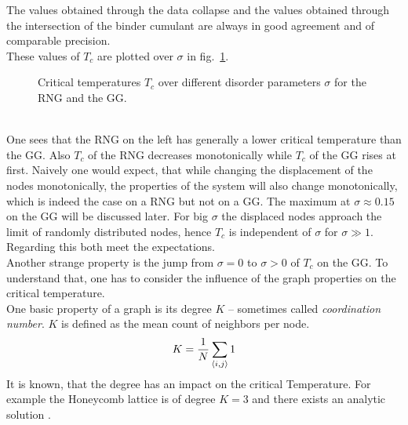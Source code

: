     The values obtained through the data collapse and the values obtained
    through the intersection of the binder cumulant are always in good
    agreement and of comparable precision.\\
    These values of \(T_c\) are plotted over \(\sigma\) in fig.\ \ref{fig:Tc}.
    \begin{figure}[htbp]
        \centering
        \caption[Critical Temperature over Different Disorder Parameters]
        {
            Critical temperatures \(T_c\) over different
            disorder parameters \(\sigma\) for
             the RNG and
             the GG.\\
        }
        \label{fig:Tc}
    \end{figure}\\
    One sees that the RNG on the left has generally a lower critical
    temperature than the GG. Also \(T_c\) of the RNG decreases
    monotonically while \(T_c\) of the GG rises at first. Naively one would
    expect, that while changing the displacement of the nodes monotonically,
    the properties of the system will also change monotonically, which is
    indeed the case on a RNG but not on a GG. The
    maximum at \(\sigma \approx 0.15\) on the GG will be discussed later.
    For big \(\sigma\) the displaced nodes approach the limit of randomly
    distributed nodes, hence \(T_c\) is independent of \(\sigma\) for
    \(\sigma \gg 1\). Regarding this both meet the expectations.\\
    Another strange property is the jump from \(\sigma = 0\) to \(\sigma > 0\)
    of \(T_c\) on the GG. To understand that, one has to
    consider the influence of the graph properties on the critical
    temperature.\\
    One basic property of a graph is its degree \(K\) -- sometimes
    called \emph{coordination number}. \(K\) is defined as the mean count
    of neighbors per node.
    \begin{equation}
        K = \frac{1}{N} \sum_{\left< i,j \right>} 1
        \label{eq:degree}
    \end{equation}
    It is known, that the degree has an impact on the critical Temperature.
    For example the Honeycomb lattice is of degree \(K=3\)
    and there exists an analytic solution \cite{Wannier1945}.
